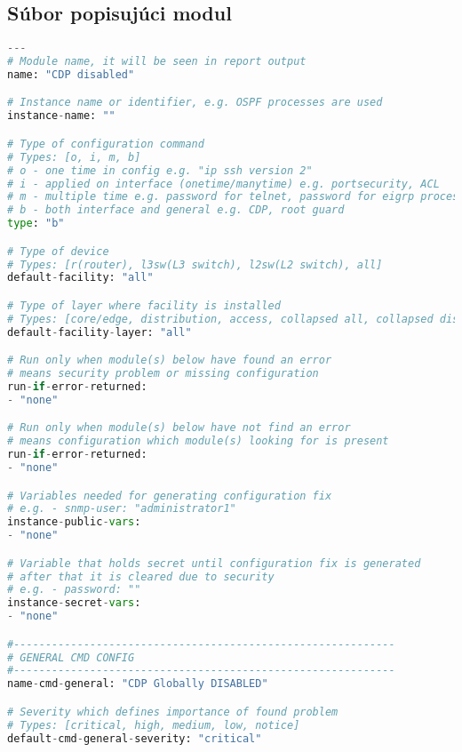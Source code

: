 \subsection{Súbor popisujúci modul}

\begin{lstlisting}[frame=single,numbers=right,caption={Konfiguračný súbor cdp\_module.yaml ktorý pobsahuje informácie na nájdenie problému, jeho odstránenie a informácie do správy},label=lst:lldp,basicstyle=\ttfamily\small, keywordstyle=\color{black},language=python,breaklines=true]
---
# Module name, it will be seen in report output
name: "CDP disabled"

# Instance name or identifier, e.g. OSPF processes are used
instance-name: ""

# Type of configuration command
# Types: [o, i, m, b]
# o - one time in config e.g. "ip ssh version 2"
# i - applied on interface (onetime/manytime) e.g. portsecurity, ACL
# m - multiple time e.g. password for telnet, password for eigrp processes
# b - both interface and general e.g. CDP, root guard
type: "b"

# Type of device
# Types: [r(router), l3sw(L3 switch), l2sw(L2 switch), all]
default-facility: "all"

# Type of layer where facility is installed
# Types: [core/edge, distribution, access, collapsed all, collapsed distribution access, collapsed core distribution, all]
default-facility-layer: "all"

# Run only when module(s) below have found an error
# means security problem or missing configuration
run-if-error-returned: 
- "none"

# Run only when module(s) below have not find an error
# means configuration which module(s) looking for is present
run-if-error-returned: 
- "none"

# Variables needed for generating configuration fix
# e.g. - snmp-user: "administrator1"
instance-public-vars:
- "none"

# Variable that holds secret until configuration fix is generated
# after that it is cleared due to security
# e.g. - password: "" 
instance-secret-vars:
- "none"

#------------------------------------------------------------
# GENERAL CMD CONFIG
#------------------------------------------------------------
name-cmd-general: "CDP Globally DISABLED"

# Severity which defines importance of found problem 
# Types: [critical, high, medium, low, notice]
default-cmd-general-severity: "critical"


\end{lstlisting}
